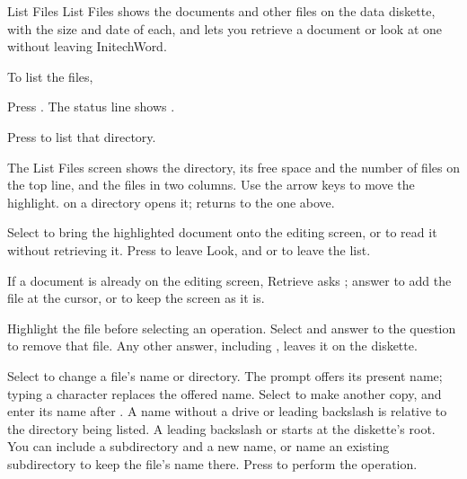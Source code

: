 \begin{Feature}{List Files}
List Files shows the documents and other files on the data diskette, with
the size and date of each, and lets you retrieve a document or look at one
without leaving InitechWord.

To list the files,
\begin{WPSteps}
\item Press .  The status line shows .
\item Press  to list that directory.
\item The List Files screen shows the directory, its free space and the
number of files on the top line, and the files in two columns.  Use the
arrow keys to move the highlight.   on a directory opens it;
 returns to the one above.
\item Select  to bring the highlighted document onto the
editing screen, or  to read it without retrieving it.  Press
 to leave Look, and  or  to leave the list.
\end{WPSteps}
If a document is already on the editing screen, Retrieve asks ; answer  to add the file at the
cursor, or  to keep the screen as it is.

\Notes
{}
Highlight the file before selecting an operation.  Select 
and answer  to the  question to remove that file.
Any other answer, including , leaves it on the diskette.

Select  to change a file's name or directory.  The
 prompt offers its present name; typing a character replaces
the offered name.  Select  to make another copy, and enter its
name after .  A name without a drive or leading
backslash is relative to the directory being listed.  A leading backslash
or  starts at the diskette's root.  You can include
a subdirectory and a new name, or name an existing subdirectory to keep
the file's name there.  Press  to perform the operation.


\end{Feature}
